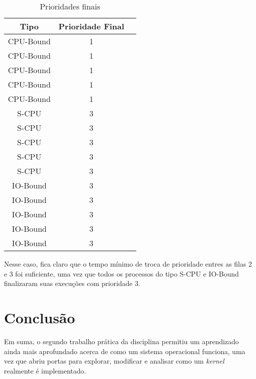 \documentclass{article}
\begin{document}
\begin{table}[H]
      \centering
      \begin{tabular}{|c|c|c|}
            \hline
            \textbf{Tipo} & \textbf{Prioridade Final} \\
            \hline
            CPU-Bound     & 1                         \\
            CPU-Bound     & 1                         \\
            CPU-Bound     & 1                         \\
            CPU-Bound     & 1                         \\
            CPU-Bound     & 1                         \\
            S-CPU         & 3                         \\
            S-CPU         & 3                         \\
            S-CPU         & 3                         \\
            S-CPU         & 3                         \\
            S-CPU         & 3                         \\
            IO-Bound      & 3                         \\
            IO-Bound      & 3                         \\
            IO-Bound      & 3                         \\
            IO-Bound      & 3                         \\
            IO-Bound      & 3                         \\
            \hline
      \end{tabular}
      \caption{Prioridades finais}
\end{table}

Nesse caso, fica claro que o tempo mínimo de troca de prioridade entres as
filas 2 e 3 foi suficiente, uma vez que todos os processos do tipo S-CPU e
IO-Bound finalizaram suas execuções com prioridade 3.

\section{Conclusão}

Em suma, o segundo trabalho prática da disciplina
permitiu um aprendizado ainda mais aprofundado acerca de como um sistema
operacional funciona, uma vez que abriu portas para explorar, modificar e
analisar como um \textit{kernel} realmente é implementado.
\end{document}

